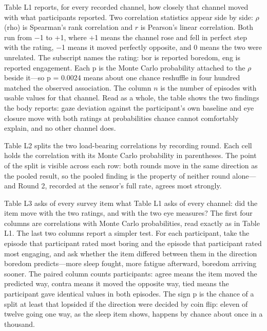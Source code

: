 Table L1 reports, for every recorded channel, how closely that channel moved with what
participants reported. Two correlation statistics appear side by side: $\rho$ (rho) is
Spearman's rank correlation and $r$ is Pearson's linear correlation. Both run from $-$1 to
+1, where +1 means the channel rose and fell in perfect step with the rating, $-$1 means it
moved perfectly opposite, and 0 means the two were unrelated. The subscript names the rating:
bor is reported boredom, eng is reported engagement. Each p is the Monte Carlo probability
attached to the $\rho$ beside it---so p = 0.0024 means about one chance reshuffle in four
hundred matched the observed association. The column $n$ is the number of episodes with
usable values for that channel. Read as a whole, the table shows the two findings the body
reports: gaze deviation against the participant's own baseline and eye closure move with both
ratings at probabilities chance cannot comfortably explain, and no other channel does.

% 

Table L2 splits the two load-bearing correlations by recording round. Each cell holds the
correlation with its Monte Carlo probability in parentheses. The point of the split is
visible across each row: both rounds move in the same direction as the pooled result, so the
pooled finding is the property of neither round alone---and Round 2, recorded at the sensor's
full rate, agrees most strongly.

% 

Table L3 asks of every survey item what Table L1 asks of every channel: did the item move
with the two ratings, and with the two eye measures? The first four columns are correlations
with Monte Carlo probabilities, read exactly as in Table L1. The last two columns report a
simpler test. For each participant, take the episode that participant rated most boring and
the episode that participant rated most engaging, and ask whether the item differed between
them in the direction boredom predicts---more sleep fought, more fatigue afterward, boredom
arriving sooner. The paired column counts participants: agree means the item moved the
predicted way, contra means it moved the opposite way, tied means the participant gave
identical values in both episodes. The sign p is the chance of a split at least that lopsided
if the direction were decided by coin flip: eleven of twelve going one way, as the sleep item
shows, happens by chance about once in a thousand.

